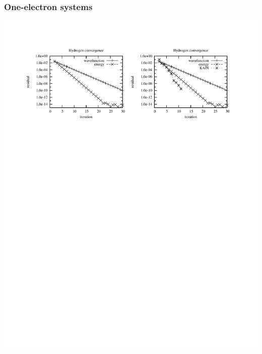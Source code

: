 %
%

\begin{frame}
    \frametitle{One-electron systems}
    \begin{center}
        \hspace{1mm}
	\includegraphics[scale=1.0, clip, viewport = 300 550 560 740]{figures/h_convergence.pdf}
        \vspace{5.5mm}
    \end{center}
\end{frame}

